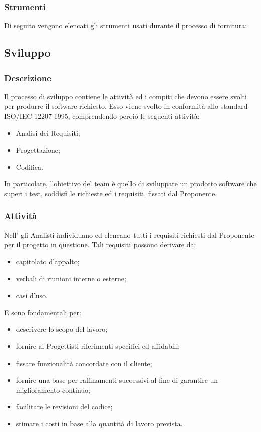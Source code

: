         \subsubsection{Strumenti}
        Di seguito vengono elencati gli strumenti usati durante il processo di fornitura:
        
    \subsection{Sviluppo}
        \subsubsection{Descrizione}
        Il processo di sviluppo contiene le attività ed i compiti che devono essere svolti per produrre il software richiesto. Esso viene svolto in conformità allo standard ISO/IEC 12207-1995, comprendendo perciò le seguenti attività:
        \begin{itemize}
        \item{Analisi dei Requisiti;}
        \item{Progettazione;}
        \item{Codifica.}
        \end{itemize}
	In particolare, l'obiettivo del team è quello di sviluppare un prodotto software che superi i test, soddisfi le richieste ed i requisiti, fissati dal Proponente.
        
            \subsubsection{Attività}
           Nell'\AdR{} gli Analisti individuano ed elencano tutti i requisiti richiesti dal Proponente per il progetto in questione. Tali requisiti possono derivare da:
           \begin{itemize}
           		\item{capitolato d'appalto;}
				\item{verbali di riunioni interne o esterne;}
				\item{casi d'uso.}
           \end{itemize}
           E sono fondamentali per:
            \begin{itemize}
        		\item{descrivere lo scopo del lavoro;}
				\item{fornire ai Progettisti riferimenti specifici ed affidabili;}
				\item{fissare funzionalità concordate con il cliente;}
				\item{fornire una base per raffinamenti successivi al fine di garantire un miglioramento continuo;}
				\item{facilitare le revisioni del codice;}
				\item{stimare i costi in base alla quantità di lavoro prevista.}
        	\end{itemize}                 
                 
